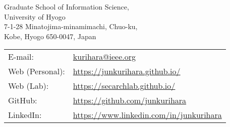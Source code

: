 {\Huge \name}


\vspace{0.25in}

\begin{minipage}{0.45\linewidth}
  Graduate School of Information Science,\\ University of Hyogo \\
  7-1-28 Minatojima-minamimachi, Chuo-ku, \\
  Kobe, Hyogo 650-0047, Japan
\end{minipage}
\begin{minipage}{0.45\linewidth}
  \begin{tabular}{ll}
    E-mail: & \href{mailto:kurihara@ieee.org}{kurihara@ieee.org} \\
    Web (Personal): & \href{https://junkurihara.github.io/}{https://junkurihara.github.io/}\\
    Web (Lab): & \href{https://secarchlab.github.io}{https://secarchlab.github.io/}\\
    GitHub: & \href{https://github.com/junkurihara}{https://github.com/junkurihara}\\
    LinkedIn: & \href{https://www.linkedin.com/in/junkurihara}{https://www.linkedin.com/in/junkurihara}
  \end{tabular}
\end{minipage}
